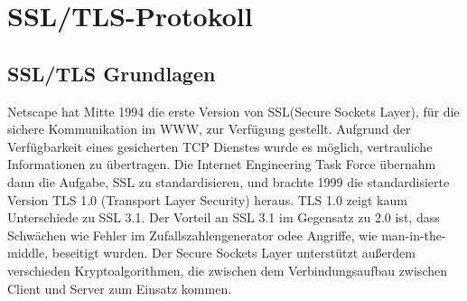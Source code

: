 \documentclass[11pt]{scrartcl}
\begin{document}
\section{SSL/TLS-Protokoll}
\label{sec:ssl/tls-protocol}

\subsection{SSL/TLS Grundlagen}
\label{sec:ssl-tls-basics}
Netscape hat Mitte 1994 die erste Version von SSL(Secure Sockets Layer), für die sichere Kommunikation im WWW, zur Verfügung gestellt. Aufgrund der Verfügbarkeit eines gesicherten TCP Dienstes wurde es möglich, vertrauliche Informationen zu übertragen. \grqq{}Die Internet Engineering Task Force übernahm dann die Aufgabe, SSL zu standardisieren, und brachte 1999 die standardisierte Version TLS 1.0 (Transport Layer Security) heraus.\grqq{}\cite{6} TLS 1.0 zeigt kaum Unterschiede zu SSL 3.1. Der Vorteil an SSL 3.1 im Gegensatz zu 2.0 ist, dass Schwächen wie Fehler im Zufallszahlengenerator odee Angriffe, wie man-in-the-middle, beseitigt wurden. Der Secure Sockets Layer unterstützt außerdem verschieden Kryptoalgorithmen, die zwischen dem Verbindungsaufbau zwischen Client und Server zum Einsatz kommen. \cite{1}\cite{3}\cite{6}
\end{document}
